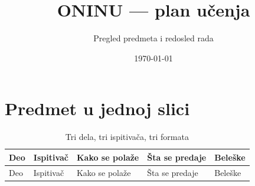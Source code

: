 \documentclass[11pt,a4paper,parskip=half,headsepline,numbers=noenddot]{scrartcl}
\title{ONINU --- plan učenja}
\subtitle{Pregled predmeta i redosled rada}
\author{}
\date{\today}
\begin{document}
\maketitle
\thispagestyle{plain.scrheadings}

\section{Predmet u jednoj slici}

\begin{longtable}[]{@{}
  >{\raggedright\arraybackslash}p{}
  >{\raggedright\arraybackslash}p{}
  >{\raggedright\arraybackslash}p{}
  >{\raggedright\arraybackslash}p{}
  >{\raggedright\arraybackslash}p{}@{}}
\caption{Tri dela, tri ispitivača, tri formata}\tabularnewline
\toprule\noalign{}
\begin{minipage}[b]{\linewidth}\raggedright
Deo
\end{minipage} & \begin{minipage}[b]{\linewidth}\raggedright
Ispitivač
\end{minipage} & \begin{minipage}[b]{\linewidth}\raggedright
Kako se polaže
\end{minipage} & \begin{minipage}[b]{\linewidth}\raggedright
Šta se predaje
\end{minipage} & \begin{minipage}[b]{\linewidth}\raggedright
Beleške
\end{minipage} \\
\midrule\noalign{}
\endfirsthead
\toprule\noalign{}
\begin{minipage}[b]{\linewidth}\raggedright
Deo
\end{minipage} & \begin{minipage}[b]{\linewidth}\raggedright
Ispitivač
\end{minipage} & \begin{minipage}[b]{\linewidth}\raggedright
Kako se polaže
\end{minipage} & \begin{minipage}[b]{\linewidth}\raggedright
Šta se predaje
\end{minipage} & \begin{minipage}[b]{\linewidth}\raggedright
Beleške
\end{minipage} \\

\end{longtable}
\end{document}
